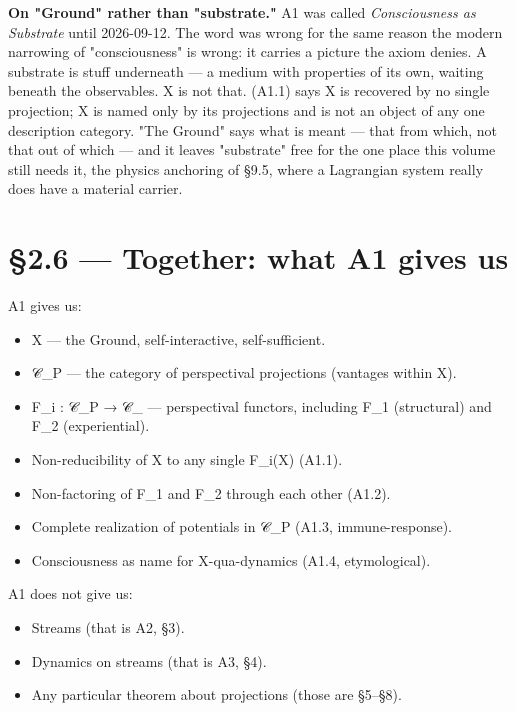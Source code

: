 \documentclass[11pt, openany]{book}
\newcommand{\sectionbreak}{\clearpage}
\begin{document}
\textbf{On "Ground" rather than "substrate."} A1 was called \textit{Consciousness as Substrate} until 2026-09-12. The word was wrong for the same reason the modern narrowing of "consciousness" is wrong: it carries a picture the axiom denies. A substrate is stuff underneath --- a medium with properties of its own, waiting beneath the observables. X is not that. (A1.1) says X is recovered by no single projection; X is named only by its projections and is not an object of any one description category. "The Ground" says what is meant --- that from which, not that out of which --- and it leaves "substrate" free for the one place this volume still needs it, the physics anchoring of §9.5, where a Lagrangian system really does have a material carrier.

\sectionbreak

\section{§2.6 --- Together: what A1 gives us}

A1 gives us:
\begin{itemize}
\item X --- the Ground, self-interactive, self-sufficient.
\item 𝒞\_\allowbreak{}P --- the category of perspectival projections (vantages within X).
\item F\_\allowbreak{}i : 𝒞\_\allowbreak{}P → 𝒞\_ --- perspectival functors, including F\_\allowbreak{}1 (structural) and F\_\allowbreak{}2 (experiential).
\item Non-reducibility of X to any single F\_\allowbreak{}i(X) (A1.1).
\item Non-factoring of F\_\allowbreak{}1 and F\_\allowbreak{}2 through each other (A1.2).
\item Complete realization of potentials in 𝒞\_\allowbreak{}P (A1.3, immune-response).
\item Consciousness as name for X-qua-dynamics (A1.4, etymological).
\end{itemize}

A1 does not give us:
\begin{itemize}
\item Streams (that is A2, §3).
\item Dynamics on streams (that is A3, §4).
\item Any particular theorem about projections (those are §5–§8).
\end{itemize}
\end{document}
